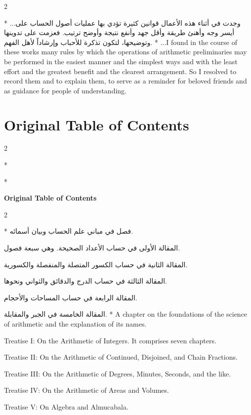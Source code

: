 \documentclass[11pt,a4paper]{article}
\newcommand{\ar}[1]{{\arabicfont\beginR #1\endR}}
\newenvironment{bilingual}{%
  \vspace{0.3em}%
  \begin{paracol}{2}%
}{%
  \end{paracol}%
  \vspace{0.3em}%
}
\begin{document}
\begin{bilingual}
\switchcolumn[0]*
\ar{...وجدت في أثناء هذه الأعمال قوانين كثيرة تؤدي بها عمليات أصول الحساب على أيسر وجه وأهنئ طريقة وأقل جهد وأنفع نتيجة وأوضح ترتيب. فعزمت على تدوينها وتوضيحها، لتكون تذكرة للأحباب وإرشاداً لأهل الفهم.}
\switchcolumn[1]*
...I found in the course of these works many rules by which the operations of arithmetic
preliminaries may be performed in the easiest manner and the simplest
ways and with the least effort and the greatest benefit and the clearest
arrangement. So I resolved to record them and to explain them, to serve
as a reminder for beloved friends and as guidance for people of
understanding.
\end{bilingual}
\clearpage

\section*{Original Table of Contents}

\begin{bilingual}
\switchcolumn[0]*
\begin{center}
\textbf{\color{chapcolor}\ar{فهرس الكتاب الأصلي}}
\end{center}
\switchcolumn[1]*
\begin{center}
\textbf{\color{chapcolor}Original Table of Contents}
\end{center}
\end{bilingual}

\begin{bilingual}
\switchcolumn[0]*
\ar{فصل في مباني علم الحساب وبيان أسمائه.}

\ar{المقالة الأولى في حساب الأعداد الصحيحة. وهي سبعة فصول.}

\ar{المقالة الثانية في حساب الكسور المتصلة والمنفصلة والكسورية.}

\ar{المقالة الثالثة في حساب الدرج والدقائق والثواني ونحوها.}

\ar{المقالة الرابعة في حساب المساحات والأحجام.}

\ar{المقالة الخامسة في الجبر والمقابلة.}
\switchcolumn[1]*
A chapter on the foundations of the science of arithmetic and the explanation of its names.

Treatise I: On the Arithmetic of Integers. It comprises seven chapters.

Treatise II: On the Arithmetic of Continued, Disjoined, and Chain Fractions.

Treatise III: On the Arithmetic of Degrees, Minutes, Seconds, and the like.

Treatise IV: On the Arithmetic of Areas and Volumes.

Treatise V: On Algebra and Almucabala.
\end{bilingual}
\end{document}
